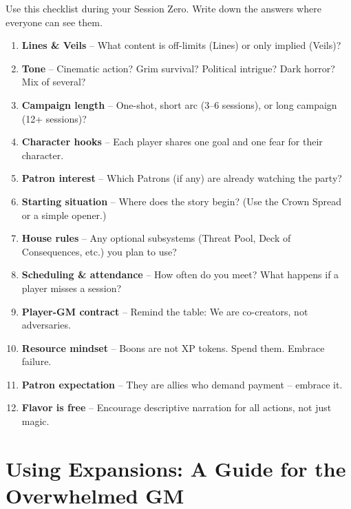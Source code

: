\begin{tcolorbox}[colback=green!5!white, colframe=green!75!black, title=Session Zero Checklist, fonttitle=\bfseries,breakable]
Use this checklist during your Session Zero. Write down the answers where everyone can see them.
\begin{enumerate}
  \item \textbf{Lines \& Veils} -- What content is off-limits (Lines) or only implied (Veils)?
  \item \textbf{Tone} -- Cinematic action? Grim survival? Political intrigue? Dark horror? Mix of several?
  \item \textbf{Campaign length} -- One-shot, short arc (3--6 sessions), or long campaign (12+ sessions)?
  \item \textbf{Character hooks} -- Each player shares one goal and one fear for their character.
  \item \textbf{Patron interest} -- Which Patrons (if any) are already watching the party?
  \item \textbf{Starting situation} -- Where does the story begin? (Use the Crown Spread or a simple opener.)
  \item \textbf{House rules} -- Any optional subsystems (Threat Pool, Deck of Consequences, etc.) you plan to use?
  \item \textbf{Scheduling \& attendance} -- How often do you meet? What happens if a player misses a session?
  \item \textbf{Player-GM contract} -- Remind the table: \textquotedbl We are co-creators, not adversaries.\textquotedbl
  \item \textbf{Resource mindset} -- \textquotedbl Boons are not XP tokens. Spend them. Embrace failure.\textquotedbl
  \item \textbf{Patron expectation} -- \textquotedbl They are allies who demand payment -- embrace it.\textquotedbl
  \item \textbf{Flavor is free} -- Encourage descriptive narration for all actions, not just magic.
\end{enumerate}
\end{tcolorbox}


\clearpage
\chapter{Using Expansions: A Guide for the Overwhelmed GM}
\label{ch:using-expansions}

